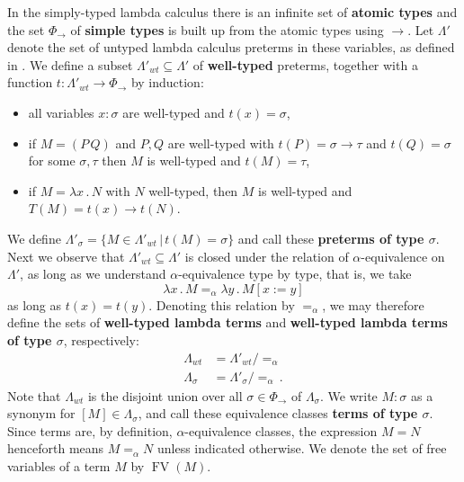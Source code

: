 \documentclass[english,letter paper,12pt,leqno]{article}
\def\be{\begin{equation}}
\def\ee{\end{equation}}
\def\ldot{\,.\,}
\def\typearrow{\Rightarrow}
\def\FV{\operatorname{FV}}
\def\l{\,|\,}
\theoremstyle{example}
\numberwithin{equation}{section}
\def\be{\begin{equation}}
\def\ee{\end{equation}}
\def\ldot{\,.\,}
\def\FV{\operatorname{FV}}
\def\typearrow{\rightarrow}
\begin{document}
In the simply-typed lambda calculus \cite[Chapter 3]{sorensen} there is an infinite set of \textbf{atomic types} and the set $\Phi_{\typearrow}$ of \textbf{simple types} is built up from the atomic types using $\typearrow$. Let $\Lambda'$ denote the set of untyped lambda calculus preterms in these variables, as defined in \cite[Chapter 1]{sorensen}. We define a subset $\Lambda'_{wt} \subseteq \Lambda'$ of \textbf{well-typed} preterms, together with a function $t: \Lambda'_{wt} \longrightarrow \Phi_{\typearrow}$ by induction:
\begin{itemize}
	\item all variables $x : \sigma$ are well-typed and $t(x) = \sigma$,
	\item if $M = (P \, Q)$ and $P,Q$ are well-typed with $t(P) = \sigma \typearrow \tau$ and $t(Q) = \sigma$ for some $\sigma, \tau$ then $M$ is well-typed and $t(M) = \tau$,
	\item if $M = \lambda x\ldot N$ with $N$ well-typed, then $M$ is well-typed and $T(M) = t(x) \typearrow t(N)$.
\end{itemize}
We define $\Lambda'_\sigma = \{ M \in \Lambda'_{wt} \l t(M) = \sigma \}$ and call these \textbf{preterms of type $\sigma$}. Next we observe that $\Lambda'_{wt} \subseteq \Lambda'$ is closed under the relation of $\alpha$-equivalence on $\Lambda'$, as long as we understand $\alpha$-equivalence type by type, that is, we take
\[
\lambda x \ldot M =_\alpha \lambda y\ldot M[x := y]
\]
as long as $t(x) = t(y)$. Denoting this relation by $=_\alpha$, we may therefore define the sets of \textbf{well-typed lambda terms} and \textbf{well-typed lambda terms of type $\sigma$}, respectively:
\begin{align}
	\Lambda_{wt} &= \Lambda'_{wt} / =_\alpha\,\\
	\Lambda_\sigma &= \Lambda'_\sigma / =_\alpha\,.
\end{align}
Note that $\Lambda_{wt}$ is the disjoint union over all $\sigma \in \Phi_{\typearrow}$ of $\Lambda_\sigma$. We write $M: \sigma$ as a synonym for $[M] \in \Lambda_\sigma$, and call these equivalence classes \textbf{terms of type $\sigma$}. Since terms are, by definition, $\alpha$-equivalence classes, the expression $M = N$ henceforth means $M =_\alpha N$ unless indicated otherwise. We denote the set of free variables of a term $M$ by $\FV(M)$.

\end{document}
